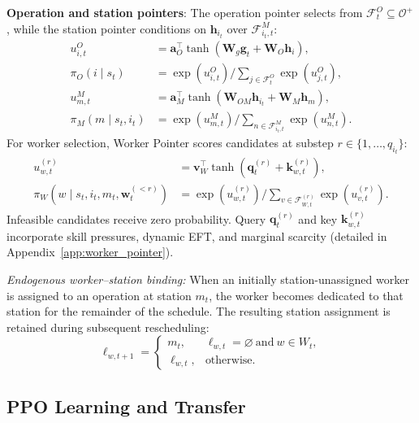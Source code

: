 \documentclass[journal,10pt]{IEEEtran}
\begin{document}
\textbf{Operation and station pointers}:
The operation pointer selects from $\mathcal{F}_t^O\subseteq\mathcal{O}^+$, while the station pointer conditions on $\mathbf{h}_{i_t}$ over $\mathcal{F}_{i_t,t}^M$:
\begin{align}
u_{i,t}^O &= \mathbf a_O^{\top}\tanh(\mathbf W_g\mathbf g_t + \mathbf W_O\mathbf h_i), \\
\pi_O(i\mid s_t) &= \exp(u_{i,t}^O)\Big/\textstyle\sum_{j\in\mathcal F_t^O}\exp(u_{j,t}^O), \\
u_{m,t}^M &= \mathbf a_M^{\top}\tanh(\mathbf W_{OM}\mathbf h_{i_t} + \mathbf W_M\mathbf h_m), \\
\pi_M(m\mid s_t,i_t) &= \exp(u_{m,t}^M)\Big/\textstyle\sum_{n\in\mathcal F_{i_t,t}^M}\exp(u_{n,t}^M).
\end{align}
For worker selection, Worker Pointer scores candidates at substep $r\in\{1,\dots,q_{i_t}\}$:
\begin{align}
u_{w,t}^{(r)} &= \mathbf v_W^{\top}\tanh\left(\mathbf q_t^{(r)} + \mathbf k_{w,t}^{(r)}\right), \\
\pi_W(w\mid s_t,i_t,m_t,\mathbf w_t^{(<r)}) &= \exp(u_{w,t}^{(r)})\Big/\textstyle\sum_{v\in\mathcal F_{W,t}^{(r)}}\exp(u_{v,t}^{(r)}).
\end{align}
Infeasible candidates receive zero probability. Query $\mathbf q_t^{(r)}$ and key $\mathbf k_{w,t}^{(r)}$ incorporate skill pressures, dynamic EFT, and marginal scarcity (detailed in Appendix~\ref{app:worker_pointer}).

\textit{Endogenous worker--station binding:}
When an initially station-unassigned worker is assigned to
an operation at station $m_t$, the worker becomes dedicated
to that station for the remainder of the schedule.
The resulting station assignment is retained during
subsequent rescheduling:
\begin{equation}
\ell_{w,t+1} = \begin{cases} m_t, & \ell_{w,t}=\varnothing \ \text{and}\ w\in W_t, \\ \ell_{w,t}, & \text{otherwise}. \end{cases}
\end{equation}

\subsection{PPO Learning and Transfer}
\end{document}
